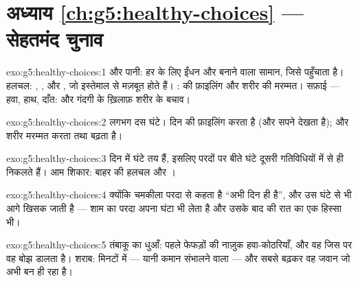 \section*{अध्याय \ref{ch:g5:healthy-choices} --- सेहतमंद चुनाव}

\begin{solution}{exo:g5:healthy-choices:1}
 और पानी: हर  के लिए ईंधन और बनाने वाला सामान, जिसे 
पहुँचाता है। हलचल: , ,  और , जो इस्तेमाल से
मज़बूत होते हैं। :  की फ़ाइलिंग और शरीर की मरम्मत। सफ़ाई ---
हवा, हाथ, दाँत:  और गंदगी के ख़िलाफ़ शरीर के बचाव।
\end{solution}

\begin{solution}{exo:g5:healthy-choices:2}
लगभग दस घंटे।  दिन की फ़ाइलिंग करता है (और सपने देखता है); और
शरीर मरम्मत करता तथा बढ़ता है।
\end{solution}

\begin{solution}{exo:g5:healthy-choices:3}
दिन में घंटे तय हैं, इसलिए परदों पर बीते घंटे दूसरी गतिविधियों में से
ही निकलते हैं। आम शिकार: बाहर की हलचल और ।
\end{solution}

\begin{solution}{exo:g5:healthy-choices:4}
क्योंकि चमकीला परदा  से कहता है ``अभी दिन ही है'', और  उस
घंटे से भी आगे खिसक जाती है --- शाम का परदा अपना घंटा भी लेता है और
उसके बाद की रात का एक हिस्सा भी।
\end{solution}

\begin{solution}{exo:g5:healthy-choices:5}
तंबाकू का धुआँ: पहले फेफड़ों की नाज़ुक हवा-कोठरियाँ, और वह  जिस पर
वह बोझ डालता है। शराब: मिनटों में  --- यानी कमान संभालने वाला
--- और सबसे बढ़कर वह जवान  जो अभी बन ही रहा है।
\end{solution}

